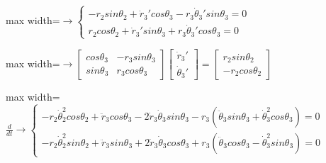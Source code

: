 \documentclass[11pt,a4paper]{article}
\begin{document}
\begin{center}\begin{adjustbox}{max width=\linewidth}$\displaystyle \rightarrow \left\{ \begin{gathered}-{r}_{2}sin{\theta }_{2}+{\dot{r}}_{3}'cos{\theta }_{3}-{r}_{3}{\dot{\theta }}_{3}'sin{\theta }_{3}=0\\{r}_{2}cos{\theta }_{2}+{\dot{r}}_{3}'sin{\theta }_{3}+{r}_{3}{\dot{\theta }}_{3}'cos{\theta }_{3}=0\end{gathered}\right.$\end{adjustbox}\end{center}

\begin{center}\begin{adjustbox}{max width=\linewidth}$\displaystyle \rightarrow \left[ \begin{matrix}cos{\theta }_{3} & -{r}_{3}sin{\theta }_{3}\\sin{\theta }_{3} & {r}_{3}cos{\theta }_{3}\end{matrix}\right]\left[ \begin{gathered}{\dot{r}}_{3}'\\{\dot{\theta }}_{3}'\end{gathered}\right]=\left[ \begin{gathered}{r}_{2}sin{\theta }_{2}\\-{r}_{2}cos{\theta }_{2}\end{gathered}\right]$\end{adjustbox}\end{center}

\begin{center}\begin{adjustbox}{max width=\linewidth}$\displaystyle \frac{d}{dt}\rightarrow \left\{ \begin{gathered}-{r}_{2}{\dot{\theta }}_{2}^{2}cos{\theta }_{2}+{\ddot{r}}_{3}cos{\theta }_{3}-2{\dot{r}}_{3}{\dot{\theta }}_{3}sin{\theta }_{3}-{r}_{3}\left( {\ddot{\theta }}_{3}sin{\theta }_{3}+{\dot{\theta }}_{3}^{2}cos{\theta }_{3}\right)=0\\-{r}_{2}{\dot{\theta }}_{2}^{2}sin{\theta }_{2}+{\ddot{r}}_{3}sin{\theta }_{3}+2{\dot{r}}_{3}{\dot{\theta }}_{3}cos{\theta }_{3}+{r}_{3}\left( {\ddot{\theta }}_{3}cos{\theta }_{3}-{\dot{\theta }}_{3}^{2}sin{\theta }_{3}\right)=0\end{gathered}\right.$\end{adjustbox}\end{center}
\end{document}
